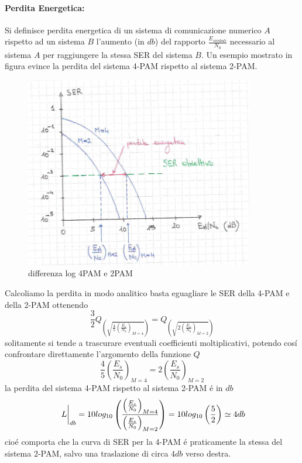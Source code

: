             \paragraph{Perdita Energetica: } Si definisce perdita energetica di un sistema di comunicazione numerico $A$ rispetto
                ad un sistema $B$ l'aumento (in $db$) del rapporto $\frac{E_{simboli}}{N_0}$ necessario al sistema $A$ per 
                raggiungere la stessa SER del sistema $B$. Un esempio mostrato in figura evince la perdita del sistema 
                4-PAM rispetto al sistema 2-PAM.
                \begin{figure}[H]
                    \centering
                    \includegraphics[width = 10cm]{media/comparazione errore ser.png}
                    \caption{differenza log 4PAM e 2PAM}
                \end{figure}  
                Calcoliamo la perdita in modo analitico basta eguagliare le SER della 4-PAM e della
                2-PAM ottenendo
                \[
                    \frac{3}{2}Q_{\displaystyle\left(\sqrt{\frac{4}{5}\left(\frac{E_s}{N_0}\right)_{M=4}}\right)} =Q_{\displaystyle\left(\sqrt{2\left(\frac{E_s}{N_0}\right)_{M=2}}\right)}      
                \]
                solitamente si tende a trascurare eventuali coefficienti moltiplicativi, potendo cosí confrontare direttamente
                l'argomento della funzione $Q$
                \[
                    \frac{4}{5}\left(\frac{E_s}{N_0}\right)_{M=4} =2\left(\frac{E_s}{N_0}\right)_{M=2}          
                \]
                la perdita del sistema 4-PAM rispetto al sistema 2-PAM é in $db$
                \[
                    \eval*{L}_{db} = 10log_{10}\left(\frac{\left(\frac{E_s}{N_0}\right)_{M=4}}{\left(\frac{E_s}{N_0}\right)_{M=2}}\right) = 10log_{10}\left(\frac{5}{2}\right) \simeq 4db    
                \]
                cioé comporta che la curva di SER per la 4-PAM é praticamente la stessa del sistema 2-PAM, salvo una traslazione di
                circa $4db$ verso destra.
